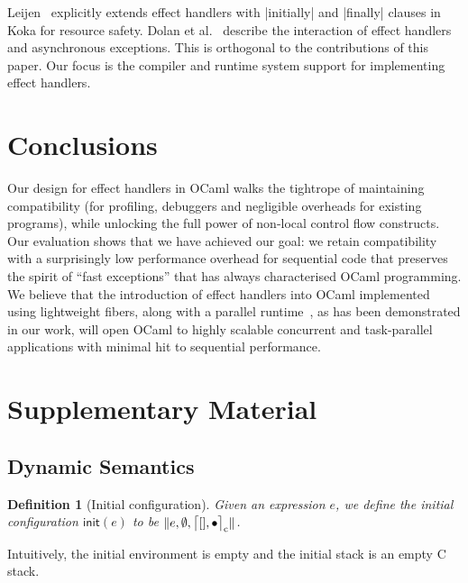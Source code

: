 \documentclass[sigplan,screen]{acmart}
\newtheorem{definition}[theorem]{Definition}
\newcommand{\cstacka}[2]{\big \lceil #1, #2 \big \rceil_{\text c}} %
\newcommand{\configa}[3]{\|#1,#2,#3\|}
\begin{document}
Leijen~\cite{Leijen18} explicitly extends effect handlers with |initially| and
|finally| clauses in Koka for resource safety. Dolan et al.~\cite{TFP17}
describe the interaction of effect handlers and asynchronous exceptions. This
is orthogonal to the contributions of this paper. Our focus is the compiler and
runtime system support for implementing effect handlers.

\section{Conclusions}
\label{sec:conc}

Our design for effect handlers in OCaml walks the tightrope of maintaining
compatibility (for profiling, debuggers and negligible overheads for existing
programs), while unlocking the full power of non-local control flow constructs.
Our evaluation shows that we have achieved our goal: we retain compatibility
with a surprisingly low performance overhead for sequential code that preserves
the spirit of ``fast exceptions'' that has always characterised OCaml
programming. We believe that the introduction of effect handlers into OCaml
implemented using lightweight fibers, along with a parallel
runtime~\cite{Sivaramakrishnan20}, as has been demonstrated in our work, will
open OCaml to highly scalable concurrent and task-parallel applications with
minimal hit to sequential performance.





\clearpage

\section*{Supplementary Material}
\setcounter{figure}{0}

\subsection*{Dynamic Semantics}

\begin{definition}[Initial configuration]
	Given an expression $e$, we define the initial configuration $\textsf{init}(e)$
	to be $\configa{e}{\emptyset}{\cstacka{[]}{\bullet}}$.
\end{definition}

Intuitively, the initial environment is empty and the initial stack is an empty
C stack.
\end{document}
